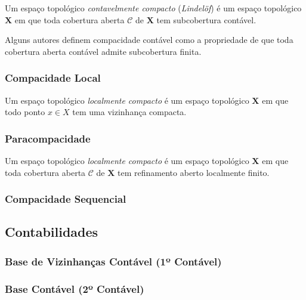\begin{defi}
Um espaço topológico \emph{contavelmente compacto} (\emph{Lindelöf}) é um espaço topológico $\bm X$ em que toda cobertura aberta $\mathcal C$ de $\bm X$ tem subcobertura contável.
\end{defi}

Alguns autores definem compacidade contável como a propriedade de que toda cobertura aberta contável admite subcobertura finita.

\subsubsection{Compacidade Local}

\begin{defi}
Um espaço topológico \emph{localmente compacto} é um espaço topológico $\bm X$ em que todo ponto $x \in X$ tem uma vizinhança compacta.
\end{defi}

\subsubsection{Paracompacidade}

\begin{defi}
Um espaço topológico \emph{localmente compacto} é um espaço topológico $\bm X$ em que toda cobertura aberta $\mathcal C$ de $\bm X$ tem refinamento aberto localmente finito.
\end{defi}

\subsubsection{Compacidade Sequencial}



\subsection{Contabilidades}

\subsubsection{Base de Vizinhanças Contável (1º Contável)}

\subsubsection{Base Contável (2º Contável)}










